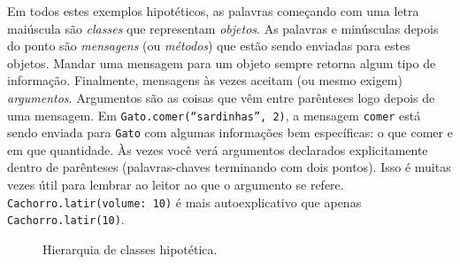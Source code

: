 Em todos estes exemplos hipotéticos, as palavras começando com uma letra maiúscula são \emph{classes} que representam \emph{objetos}. As palavras e minúsculas depois do ponto são \emph{mensagens} (ou \emph{métodos}) que estão sendo enviadas para estes objetos. Mandar uma mensagem para um objeto sempre retorna algum tipo de informação. Finalmente, mensagens às vezes aceitam (ou mesmo exigem) \emph{argumentos}. Argumentos são as coisas que vêm entre parênteses logo depois de uma mensagem. Em \texttt{Gato.comer(“sardinhas”, 2)}, a mensagem \texttt{comer} está sendo enviada para \texttt{Gato} com algumas informações bem específicas: o que comer e em que quantidade. Às vezes você verá argumentos declarados explicitamente dentro de parênteses (palavras-chaves terminando com dois pontos). Isso é muitas vezes útil para lembrar ao leitor ao que o argumento se refere. \texttt{Cachorro.latir(volume: 10)} é mais autoexplicativo que apenas \texttt{Cachorro.latir(10)}.

\begin{figure}[h]
\centerline{}
\caption{Hierarquia de classes hipotética.}
\label{fig:animal-class-chart}
\end{figure}

